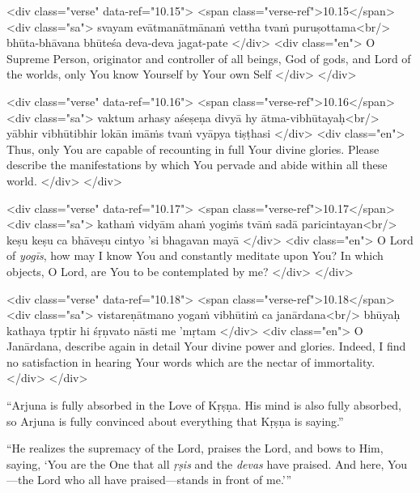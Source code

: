 \begin{html}
<div class="verse" data-ref="10.15">
  <span class="verse-ref">10.15</span>
  <div class="sa">
    svayam evātmanātmānaṁ vettha tvaṁ puruṣottama<br/>
    bhūta-bhāvana bhūteśa deva-deva jagat-pate
  </div>
  <div class="en">
    O Supreme Person, originator and controller of all beings, God of gods, and Lord of the worlds, only You know Yourself by Your own Self
  </div>
</div>
\end{html}



\begin{html}
<div class="verse" data-ref="10.16">
  <span class="verse-ref">10.16</span>
  <div class="sa">
    vaktum arhasy aśeṣeṇa divyā hy ātma-vibhūtayaḥ<br/>
    yābhir vibhūtibhir lokān imāṁs tvaṁ vyāpya tiṣṭhasi
  </div>
  <div class="en">
    Thus, only You are capable of recounting in full Your divine glories. Please describe the manifestations by which You pervade and abide within all these world.
  </div>
</div>
\end{html}



\begin{html}
<div class="verse" data-ref="10.17">
  <span class="verse-ref">10.17</span>
  <div class="sa">
    kathaṁ vidyām ahaṁ yogiṁs tvāṁ sadā paricintayan<br/>
    keṣu keṣu ca bhāveṣu cintyo ’si bhagavan mayā
  </div>
  <div class="en">
    O Lord of \textit{yogīs}, how may I know You and constantly meditate upon You? In which objects, O Lord, are You to be contemplated by me?
  </div>
</div>
\end{html}



\begin{html}
<div class="verse" data-ref="10.18">
  <span class="verse-ref">10.18</span>
  <div class="sa">
    vistareṇātmano yogaṁ vibhūtiṁ ca janārdana<br/>
    bhūyaḥ kathaya tṛptir hi śṛṇvato nāsti me ’mṛtam
  </div>
  <div class="en">
    O Janārdana, describe again in detail Your divine power and glories. Indeed, I find no satisfaction in hearing Your words which are the nectar of immortality.
  </div>
</div>
\end{html}




\enquote{Arjuna is fully absorbed in the Love of Kṛṣṇa. His mind is also fully absorbed, so Arjuna is fully convinced about everything that Kṛṣṇa is saying.}

\enquote{He realizes the supremacy of the Lord, praises the Lord, and bows to Him, saying, \enquote{You are the One that all \textit{ṛṣis} and the \textit{devas} have praised. And here, You---the Lord who all have praised---stands in front of me.}}

